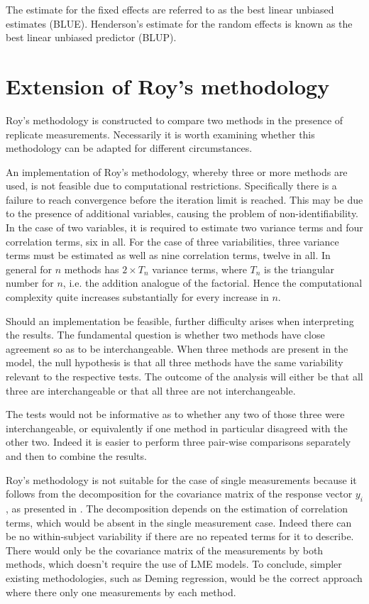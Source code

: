 \documentclass[12pt, a4paper]{report}
\theoremstyle{plain}
\theoremstyle{definition}
\theoremstyle{remark}
\begin{document}
The estimate for the fixed effects are referred to as the best linear unbiased estimates (BLUE). Henderson's estimate for the random effects is known as the best linear unbiased predictor (BLUP).



\section{Extension of Roy's methodology}
Roy's methodology is constructed to compare two methods in the presence of replicate measurements. Necessarily it is worth examining whether this methodology can be adapted for different circumstances.

An implementation of Roy's methodology, whereby three or more methods are used, is not feasible due to computational restrictions. Specifically there is a failure to reach convergence before the iteration limit is reached. This may be due to the presence of additional variables, causing the problem of non-identifiability. In the case of two variables, it is required to estimate two variance terms and four correlation terms, six in all. For the case of three variabilities, three variance terms must be estimated as well as nine correlation terms, twelve in all. In general for $n$ methods has $2 \times T_{n}$ variance terms, where $T_n$ is the triangular number for $n$, i.e. the addition analogue of the factorial. Hence the computational complexity quite increases substantially for every increase in $n$.

Should an implementation be feasible, further difficulty arises when interpreting the results. The fundamental question is whether two methods have close agreement so as to be interchangeable. When three methods are present in the model, the null hypothesis is that all three methods have the same variability relevant to the respective tests. The outcome of the analysis will either be that all three are interchangeable or that all three are not interchangeable.

The tests would not be informative as to whether any two of those three were interchangeable, or equivalently if one method in particular disagreed with the other two. Indeed it is easier to perform three pair-wise comparisons separately and then to combine the results.

Roy's methodology is not suitable for the case of single measurements because it follows from the decomposition for the covariance matrix of the response vector $y_{i}$, as presented in \citet{hamlett}. The decomposition depends on the estimation of correlation terms, which would be absent in the single measurement case. Indeed there can be no within-subject variability if there are no repeated terms for it to describe. There would only be the covariance matrix of the measurements by both methods, which doesn't require the use of LME models. To conclude, simpler existing methodologies, such as Deming regression, would be the correct approach where there only one measurements by each method.
\end{document}
